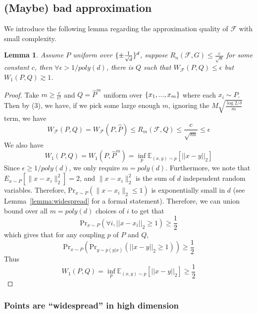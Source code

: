 \documentclass[11pt]{article}
\DeclarePairedDelimiter\set{\{}{\}}
\newcommand{\cF}{\mathcal{F}}
\newtheorem{lemma}{Lemma}
\begin{document}
\subsection{(Maybe) bad approximation}
We introduce the following lemma regarding the approximation quality of $\cF$ with small complexity.
\begin{lemma}
Assume $P$ uniform over $\set{\pm\frac{1}{\sqrt{d}}}^d$, suppose $R_n(\cF,G)\leq\frac{c}{\sqrt{n}}$ for some constant $c$, then $\forall \epsilon>1/poly(d)$, there is $Q$ such that $W_{\cF}(P,Q)\leq\epsilon$ but $W_1(P,Q)\gtrsim 1$.
\end{lemma}
\begin{proof}
Take $m\geq\frac{c}{\epsilon^2}$ and $Q=\hat{P}^m$ uniform over $\set{x_1,...,x_m}$ where each $x_i\sim P$. Then by (3), we have, if we pick some large enough $m$, ignoring the $M\sqrt{\frac{\log2/\delta}{m}}$ term, we have
$$W_{\cF}(P,Q)=W_{\cF}(P,\hat{P})\leq R_m(\cF,Q)\leq\frac{c}{\sqrt{m}}\leq\epsilon$$
We also have
$$W_1(P,Q)=W_1(P,\hat{P}^m)=\inf_p\mathbb{E}_{(x,y)\sim p}[||x-y||_2]$$
Since $\epsilon \ge 1/poly(d)$, we only require $m = poly(d)$. Furthermore, we note that $E_{x \sim P}[\|x - x_i\|_2^2] = 2$, and $\|x - x_i\|_2^2$ is the sum of $d$ independent random variables. Therefore, $\text{Pr}_{x \sim P}(\|x - x_i\|_2 \le 1)$ is exponentially small in $d$ (see Lemma~\ref{lemma:widespread} for a formal statement). Therefore, we can union bound over all $m = poly(d)$ choices of $i$ to get that 
$$\text{Pr}_{x\sim P}(\forall i, ||x-x_i||_2\geq1)\geq\frac{1}{2}$$
which gives that for any coupling $p$ of $P$ and $Q$,
$$\text{Pr}_{x\sim P}(\text{Pr}_{y\sim p(y|x)}(||x-y||_2\geq1))\geq\frac{1}{2}$$
Thus
$$W_1(P,Q)=\inf_{p}\mathbb{E}_{(x,y)\sim p}[||x-y||_2]\geq\frac{1}{2}$$
\end{proof}

\subsubsection{Points are ``widespread'' in high dimension}

\newcommand{\<}{\langle}
\renewcommand{\>}{\rangle}
\end{document}
